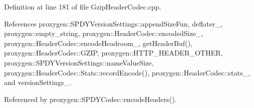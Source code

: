 Definition at line 181 of file Gzip\+Header\+Codec.\+cpp.



References proxygen\+::\+S\+P\+D\+Y\+Version\+Settings\+::append\+Size\+Fun, deflater\+\_\+, proxygen\+::empty\+\_\+string, proxygen\+::\+Header\+Codec\+::encoded\+Size\+\_\+, proxygen\+::\+Header\+Codec\+::encode\+Headroom\+\_\+, get\+Header\+Buf(), proxygen\+::\+Header\+Codec\+::\+G\+Z\+IP, proxygen\+::\+H\+T\+T\+P\+\_\+\+H\+E\+A\+D\+E\+R\+\_\+\+O\+T\+H\+ER, proxygen\+::\+S\+P\+D\+Y\+Version\+Settings\+::name\+Value\+Size, proxygen\+::\+Header\+Codec\+::\+Stats\+::record\+Encode(), proxygen\+::\+Header\+Codec\+::stats\+\_\+, and version\+Settings\+\_\+.



Referenced by proxygen\+::\+S\+P\+D\+Y\+Codec\+::encode\+Headers().


